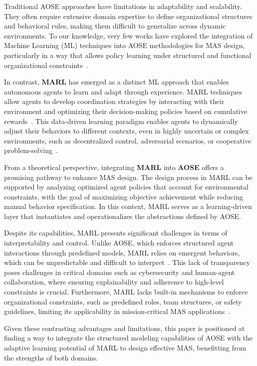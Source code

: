\documentclass[pdflatex,sn-mathphys-num]{sn-jnl}%
\theoremstyle{thmstyleone}%
\theoremstyle{thmstyletwo}%
\theoremstyle{thmstylethree}%
\begin{document}
Traditional AOSE approaches have limitations in adaptability and scalability. They often require extensive domain expertise to define organizational structures and behavioral rules, making them difficult to generalize across dynamic environments. To our knowledge, very few works have explored the integration of Machine Learning (ML) techniques into AOSE methodologies for MAS design, particularly in a way that allows policy learning under structured and functional organizational constraints~\cite{Garcia2004}.

In contrast, \textbf{MARL} has emerged as a distinct ML approach that enables autonomous agents to learn and adapt through experience. MARL techniques allow agents to develop coordination strategies by interacting with their environment and optimizing their decision-making policies based on cumulative rewards~\cite{Zhang2021}. This data-driven learning paradigm enables agents to dynamically adjust their behaviors to different contexts, even in highly uncertain or complex environments, such as decentralized control, adversarial scenarios, or cooperative problem-solving~\cite{Papoudakis2021}.

From a theoretical perspective, integrating \textbf{MARL} into \textbf{AOSE} offers a promising pathway to enhance MAS design. The design process in MARL can be supported by analyzing optimized agent policies that account for environmental constraints, with the goal of maximizing objective achievement while reducing manual behavior specification. In this context, MARL serves as a learning-driven layer that instantiates and operationalizes the abstractions defined by AOSE.

Despite its capabilities, MARL presents significant challenges in terms of interpretability and control. Unlike AOSE, which enforces structured agent interactions through predefined models, MARL relies on emergent behaviors, which can be unpredictable and difficult to interpret~\cite{Du2022}. This lack of transparency poses challenges in critical domains such as cybersecurity and human-agent collaboration, where ensuring explainability and adherence to high-level constraints is crucial. Furthermore, MARL lacks built-in mechanisms to enforce organizational constraints, such as predefined roles, team structures, or safety guidelines, limiting its applicability in mission-critical MAS applications~\cite{Nguyen2020}.

Given these contrasting advantages and limitations, this paper is positioned at finding a way to integrate the structured modeling capabilities of AOSE with the adaptive learning potential of MARL to design effective MAS, benefitting from the strengths of both domains.
\end{document}
